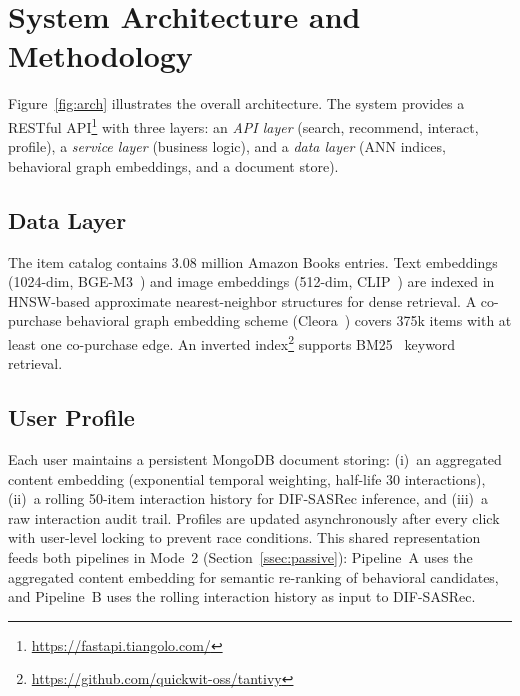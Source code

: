 \section{System Architecture and Methodology}
\label{sec:overview}

Figure~\ref{fig:arch} illustrates the overall architecture.
The system provides a RESTful API\footnote{\url{https://fastapi.tiangolo.com/}} with three layers: an \emph{API layer} (search, recommend, interact, profile),
a \emph{service layer} (business logic), and a
\emph{data layer} (ANN indices, behavioral graph embeddings, and a document store).



\subsection{Data Layer}
The item catalog contains 3.08 million Amazon Books entries.
Text embeddings (1024-dim, BGE-M3~\cite{chen2024bgem3}) and image embeddings (512-dim, CLIP~\cite{radford2021clip}) are
indexed in HNSW-based approximate nearest-neighbor structures for dense retrieval.
A co-purchase behavioral graph embedding scheme (Cleora~\cite{cleora2021}) covers 375k items
with at least one co-purchase edge.
An inverted index\footnote{\url{https://github.com/quickwit-oss/tantivy}} supports BM25~\cite{robertson1994okapi} keyword retrieval.

\subsection{User Profile}
Each user maintains a persistent MongoDB document storing:
(i)~an aggregated content embedding (exponential temporal weighting,
half-life 30 interactions),
(ii)~a rolling 50-item interaction history for DIF-SASRec inference, and
(iii)~a raw interaction audit trail.
Profiles are updated asynchronously after every click with user-level locking
to prevent race conditions.
This shared representation feeds both pipelines in Mode~2
(Section~\ref{ssec:passive}): Pipeline~A uses the aggregated content embedding
for semantic re-ranking of behavioral candidates, and Pipeline~B uses the
rolling interaction history as input to DIF-SASRec.
